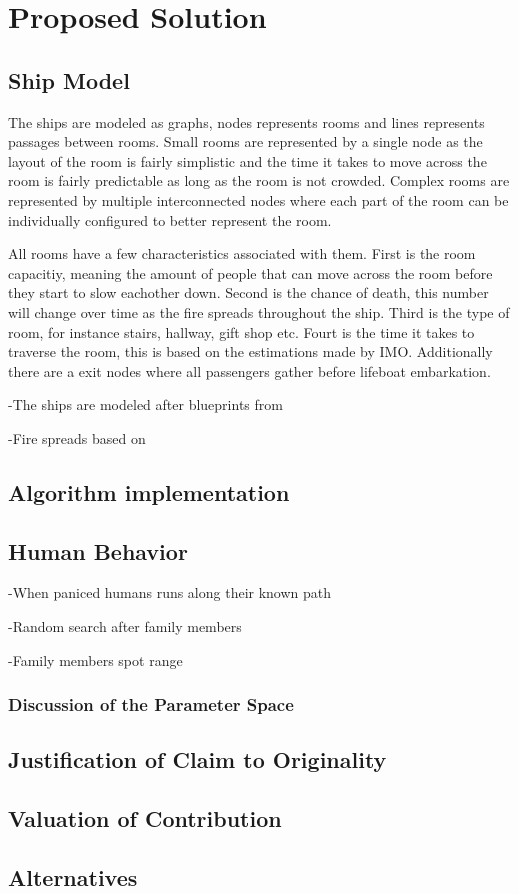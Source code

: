 \chapter{Proposed Solution}
\label{ch:solution}



\section{Ship Model}
The ships are modeled as graphs, nodes represents rooms and lines represents passages between rooms. Small rooms are represented by a single node as the layout of the room is fairly simplistic and the time it takes to move across the room is fairly predictable as long as the room is not crowded. Complex rooms are represented by multiple interconnected nodes where each part of the room can be individually configured to better represent the room. 

All rooms have a few characteristics associated with them. First is the room capacitiy, meaning the amount of people that can move across the room before they start to slow eachother down. Second is the chance of death, this number will change over time as the fire spreads throughout the ship. Third is the type of room, for instance stairs, hallway, gift shop etc. Fourt is the time it takes to traverse the room, this is based on the estimations made by IMO. Additionally there are a exit nodes where all passengers gather before lifeboat embarkation.


-The ships are modeled after blueprints from

-Fire spreads based on

\section{Algorithm implementation}



\section{Human Behavior}

-When paniced humans runs along their known path

-Random search after family members

-Family members spot range

\subsection{Discussion of the Parameter Space}

\section{Justification of Claim to Originality}

\section{Valuation of Contribution}

\section{Alternatives}
